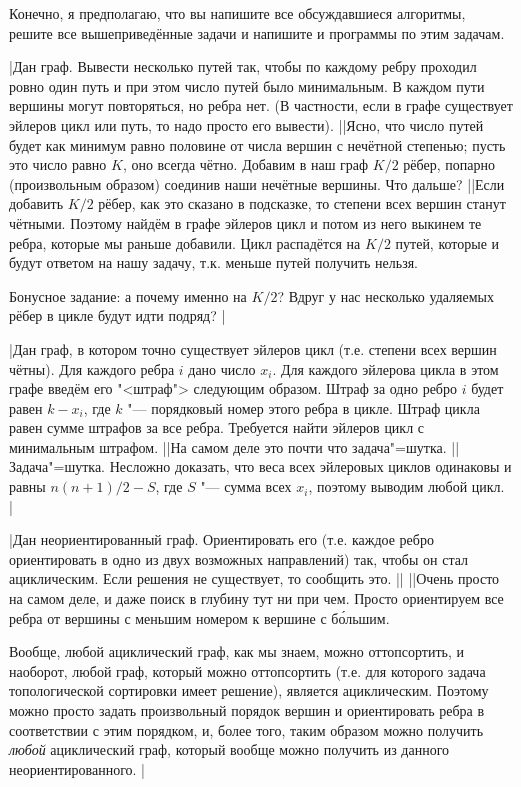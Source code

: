 

Конечно, я предполагаю, что вы напишите все обсуждавшиеся алгоритмы, решите все вышеприведённые задачи 
и напишите и программы по этим задачам.

\task|Дан граф. Вывести несколько путей так, чтобы по каждому ребру проходил ровно один путь и при этом число путей было 
минимальным. В каждом пути вершины могут повторяться, но ребра нет. (В частности, если в графе существует
эйлеров цикл или путь, то надо просто его вывести).
||Ясно, что число путей будет как минимум равно половине от числа вершин с нечётной степенью; пусть
это число равно $K$, оно всегда чётно. Добавим в наш граф $K/2$ рёбер, попарно (произвольным образом)
соединив наши нечётные вершины. Что дальше?
||Если добавить $K/2$ рёбер, как это сказано в подсказке, то степени всех вершин станут чётными.
Поэтому найдём в графе эйлеров цикл и потом из него выкинем те ребра, которые мы раньше добавили. Цикл распадётся
на $K/2$ путей, которые и будут ответом на нашу задачу, т.к. меньше путей получить нельзя.

Бонусное задание: а почему именно на $K/2$? Вдруг у нас несколько удаляемых рёбер в цикле будут идти подряд?
|\label{pathcover}

\task|Дан граф, в котором точно существует эйлеров цикл (т.е. степени всех вершин чётны). Для каждого ребра $i$
дано число $x_i$. Для каждого эйлерова цикла в этом графе введём его "<штраф"> следующим образом.
Штраф за одно ребро $i$ будет равен $k-x_i$, где $k$ "--- порядковый номер этого ребра в цикле. Штраф цикла
равен сумме штрафов за все ребра. Требуется найти эйлеров цикл с минимальным штрафом.
||На самом деле это почти что задача"=шутка.
||Задача"=шутка. Несложно доказать, что веса всех эйлеровых циклов одинаковы и равны $n(n+1)/2-S$,
где $S$ "--- сумма всех $x_i$, поэтому выводим любой цикл.
|\label{postman}

\task|Дан неориентированный граф. Ориентировать его (т.е. каждое ребро ориентировать в одно из двух возможных
направлений) так, чтобы он стал ациклическим. Если решения не существует, то сообщить это.
||
||Очень просто на самом деле, и даже поиск в глубину тут ни при чем. Просто
ориентируем все ребра от вершины с меньшим номером к вершине с б\'{о}льшим.

Вообще, любой ациклический граф, как мы знаем, можно оттопсортить, и наоборот, любой граф, который можно
оттопсортить (т.е. для которого задача топологической сортировки имеет решение), является ациклическим.
Поэтому можно просто задать произвольный порядок вершин и ориентировать ребра в соответствии с этим порядком,
и, более того, таким образом можно получить \textit{любой} ациклический граф, который вообще можно
получить из данного неориентированного.
|\label{nondirecttoacyclic}


